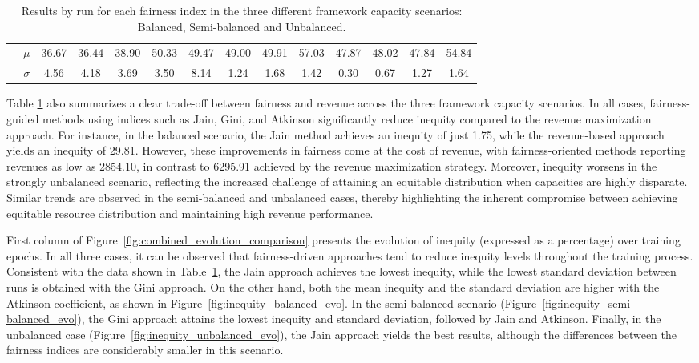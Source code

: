 \documentclass[preprint,12pt]{elsarticle}
\begin{document}
\begin{table}[htbp]
\begin{adjustbox}{max width=\textwidth}
\begin{tabular}{|c|c|cccc|cccc|cccc|}
   & $\mu$    & 36.67   & 36.44   & 38.90   & 50.33   & 49.47   & 49.00   & 49.91   & 57.03   & 47.87   & 48.02   & 47.84   & 54.84 \\
\cline{2-14}
   & $\sigma$ & 4.56    & 4.18    & 3.69    & 3.50    & 8.14    & 1.24    & 1.68    & 1.42    & 0.30    & 0.67    & 1.27    & 1.64 \\
\hline
\end{tabular}
\end{adjustbox}
\caption{Results by run for each fairness index in the three different framework capacity scenarios: Balanced, Semi-balanced and Unbalanced.}
\label{tab:comparison_summarized}
\end{table}

Table \ref{tab:comparison_summarized} also summarizes a clear trade-off between fairness and revenue across the three framework capacity scenarios. In all cases, fairness-guided methods using indices such as Jain, Gini, and Atkinson significantly reduce inequity compared to the revenue maximization approach. For instance, in the balanced scenario, the Jain method achieves an inequity of just 1.75, while the revenue-based approach yields an inequity of 29.81. However, these improvements in fairness come at the cost of revenue, with fairness-oriented methods reporting revenues as low as 2854.10, in contrast to 6295.91 achieved by the revenue maximization strategy. Moreover, inequity worsens in the strongly unbalanced scenario, reflecting the increased challenge of attaining an equitable distribution when capacities are highly disparate. Similar trends are observed in the semi-balanced and unbalanced cases, thereby highlighting the inherent compromise between achieving equitable resource distribution and maintaining high revenue performance.

First column of Figure~\ref{fig:combined_evolution_comparison} presents the evolution of inequity (expressed as a percentage) over training epochs. In all three cases, it can be observed that fairness-driven approaches tend to reduce inequity levels throughout the training process. Consistent with the data shown in Table~\ref{tab:comparison_summarized}, the Jain approach achieves the lowest inequity, while the lowest standard deviation between runs is obtained with the Gini approach. On the other hand, both the mean inequity and the standard deviation are higher with the Atkinson coefficient, as shown in Figure~\ref{fig:inequity_balanced_evo}. In the semi-balanced scenario (Figure~\ref{fig:inequity_semi-balanced_evo}), the Gini approach attains the lowest inequity and standard deviation, followed by Jain and Atkinson. Finally, in the unbalanced case (Figure~\ref{fig:inequity_unbalanced_evo}), the Jain approach yields the best results, although the differences between the fairness indices are considerably smaller in this scenario.
\end{document}
